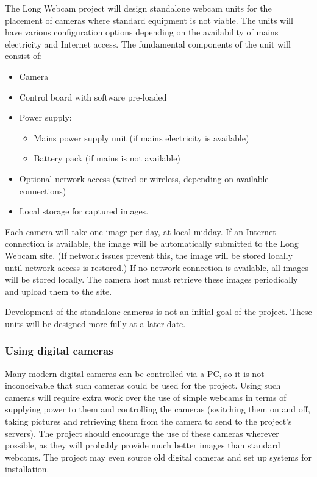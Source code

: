 \documentclass[11pt,a4paper]{article}
\begin{document}
The Long Webcam project will design standalone webcam units for the placement of cameras where standard equipment is not viable. The units will have various configuration options depending on the availability of mains electricity and Internet access. The fundamental components of the unit will consist of:

\begin{itemize}
\item Camera
\item Control board with software pre-loaded
\item Power supply:
\begin{itemize}
\item Mains power supply unit (if mains electricity is available)
\item Battery pack (if mains is not available)
\end{itemize}
\item Optional network access (wired or wireless, depending on available connections)
\item Local storage for captured images.
\end{itemize}

Each camera will take one image per day, at local midday. If an Internet connection is available, the image will be automatically submitted to the Long Webcam site. (If network issues prevent this, the image will be stored locally until network access is restored.) If no network connection is available, all images will be stored locally. The camera host must retrieve these images periodically and upload them to the site.

Development of the standalone cameras is not an initial goal of the project. These units will be designed more fully at a later date.

\subsubsection{Using digital cameras}
Many modern digital cameras can be controlled via a PC, so it is not inconceivable that such cameras could be used for the project. Using such cameras will require extra work over the use of simple webcams in terms of supplying power to them and controlling the cameras (switching them on and off, taking pictures and retrieving them from the camera to send to the project's servers). The project should encourage the use of these cameras wherever possible, as they will probably provide much better images than standard webcams. The project may even source old digital cameras and set up systems for installation.
\end{document}
